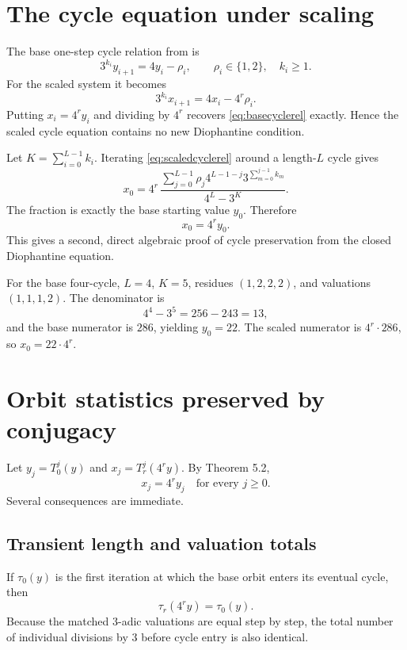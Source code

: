 \documentclass[11pt]{article}
\begin{document}
\section{The cycle equation under scaling}
The base one-step cycle relation from \cite{BanazadehBase} is
\begin{equation}
3^{k_i}y_{i+1}=4y_i-\rho_i,
\qquad \rho_i\in\{1,2\},\quad k_i\ge1.
\label{eq:basecyclerel}
\end{equation}
For the scaled system it becomes
\begin{equation}
3^{k_i}x_{i+1}=4x_i-4^r\rho_i.
\label{eq:scaledcyclerel}
\end{equation}
Putting $x_i=4^ry_i$ and dividing by $4^r$ recovers \eqref{eq:basecyclerel} exactly. Hence the scaled cycle equation contains no new Diophantine condition.

Let $K=\sum_{i=0}^{L-1}k_i$. Iterating \eqref{eq:scaledcyclerel} around a length-$L$ cycle gives
\begin{equation}
x_0=
4^r\,
\frac{\displaystyle\sum_{j=0}^{L-1}
\rho_j4^{L-1-j}3^{\sum_{m=0}^{j-1}k_m}}
{4^L-3^K}.
\label{eq:closedcycle}
\end{equation}
The fraction is exactly the base starting value $y_0$. Therefore
\begin{equation}
\boxed{x_0=4^ry_0.}
\end{equation}
This gives a second, direct algebraic proof of cycle preservation from the closed Diophantine equation.

For the base four-cycle, $L=4$, $K=5$, residues $(1,2,2,2)$, and valuations $(1,1,1,2)$. The denominator is
\[
4^4-3^5=256-243=13,
\]
and the base numerator is $286$, yielding $y_0=22$. The scaled numerator is $4^r\cdot286$, so $x_0=22\cdot4^r$.

\section{Orbit statistics preserved by conjugacy}
Let $y_j=T_0^j(y)$ and $x_j=T_r^j(4^ry)$. By Theorem 5.2,
\begin{equation}
x_j=4^ry_j\quad\text{for every }j\ge0.
\end{equation}
Several consequences are immediate.

\subsection{Transient length and valuation totals}
If $\tau_0(y)$ is the first iteration at which the base orbit enters its eventual cycle, then
\begin{equation}
\tau_r(4^ry)=\tau_0(y).
\end{equation}
Because the matched 3-adic valuations are equal step by step, the total number of individual divisions by $3$ before cycle entry is also identical.
\end{document}
